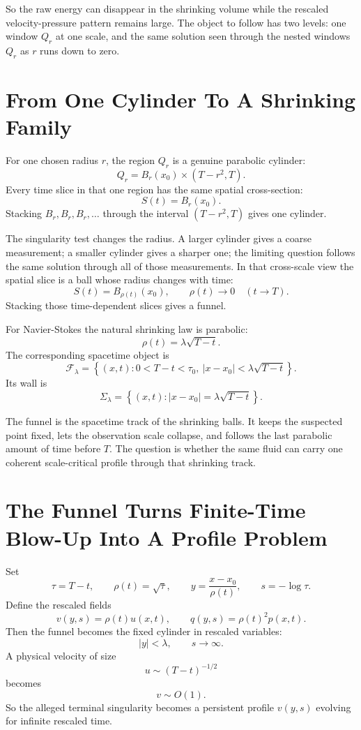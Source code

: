 \documentclass[11pt]{article}
\newcommand{\F}{\mathcal F_\lambda}
\newcommand{\Sig}{\Sigma_\lambda}
\begin{document}
So the raw energy can disappear in the shrinking volume while the rescaled velocity-pressure pattern remains large. The object to follow has two levels: one window \(Q_r\) at one scale, and the same solution seen through the nested windows \(Q_r\) as \(r\) runs down to zero.

\section{From One Cylinder To A Shrinking Family}

For one chosen radius \(r\), the region \(Q_r\) is a genuine parabolic cylinder:
\[
Q_r=B_r(x_0)\times(T-r^2,T).
\]
Every time slice in that one region has the same spatial cross-section:
\[
S(t)=B_r(x_0).
\]
Stacking \(B_r,B_r,B_r,\ldots\) through the interval \((T-r^2,T)\) gives one cylinder.

The singularity test changes the radius. A larger cylinder gives a coarse measurement; a smaller cylinder gives a sharper one; the limiting question follows the same solution through all of those measurements. In that cross-scale view the spatial slice is a ball whose radius changes with time:
\[
S(t)=B_{\rho(t)}(x_0),
\qquad
\rho(t)\to0\quad(t\to T).
\]
Stacking those time-dependent slices gives a funnel.

For Navier-Stokes the natural shrinking law is parabolic:
\[
\rho(t)=\lambda\sqrt{T-t}.
\]
The corresponding spacetime object is
\[
\F=
\left\{(x,t):0<T-t<\tau_0,\ |x-x_0|<\lambda\sqrt{T-t}\right\}.
\]
Its wall is
\[
\Sig=
\left\{(x,t): |x-x_0|=\lambda\sqrt{T-t}\right\}.
\]

The funnel is the spacetime track of the shrinking balls. It keeps the suspected point fixed, lets the observation scale collapse, and follows the last parabolic amount of time before \(T\). The question is whether the same fluid can carry one coherent scale-critical profile through that shrinking track.

\section{The Funnel Turns Finite-Time Blow-Up Into A Profile Problem}

Set
\[
\tau=T-t,
\qquad
\rho(t)=\sqrt{\tau},
\qquad
y=\frac{x-x_0}{\rho(t)},
\qquad
s=-\log\tau .
\]
Define the rescaled fields
\[
v(y,s)=\rho(t)u(x,t),
\qquad
q(y,s)=\rho(t)^2p(x,t).
\]
Then the funnel becomes the fixed cylinder in rescaled variables:
\[
|y|<\lambda,
\qquad
s\to\infty.
\]
A physical velocity of size
\[
u\sim (T-t)^{-1/2}
\]
becomes
\[
v\sim O(1).
\]
So the alleged terminal singularity becomes a persistent profile \(v(y,s)\) evolving for infinite rescaled time.
\end{document}
